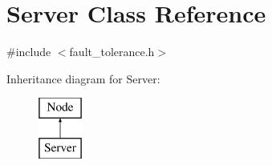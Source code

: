 \hypertarget{classServer}{\section{Server Class Reference}
\label{classServer}
}


{\ttfamily \#include $<$fault\-\_\-tolerance.\-h$>$}

Inheritance diagram for Server\-:\begin{figure}[H]
\begin{center}
\leavevmode
\includegraphics[height=2.000000cm]{classServer}
\end{center}
\end{figure}
